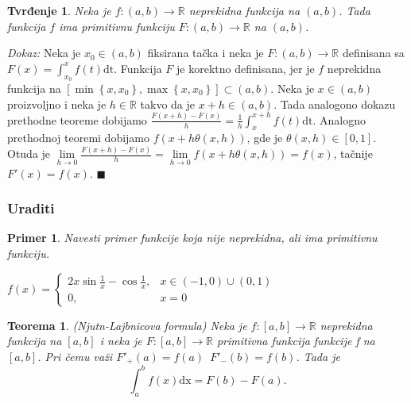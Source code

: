 \documentclass{article}
\newtheorem{teorema}{Teorema}[section]
\newtheorem{tvr}{Tvrđenje}[section]
\newtheorem{prim}{Primer}[section]
\begin{document}
\begin{tvrbox}
    \label{tvrđenje_2.1}
    \begin{tvr}
        Neka je $f: \left(a, b\right) \longrightarrow \mathbb{R}$ neprekidna funkcija na $\left(a,b\right)$. Tada funkcija $f$ ima primitivnu funkciju $F: \left(a,b\right)\longrightarrow\mathbb{R}$ na $\left(a, b\right)$.
    \end{tvr}
\end{tvrbox}
\textit{Dokaz:} Neka je $x_0\in\left(a, b\right)$ fiksirana tačka i neka je $F:\left(a, b\right) \longrightarrow \mathbb{R}$ definisana sa $F\left(x\right) = \displaystyle\int^x_{x_0} f\left(t\right)\text{dt}$.
Funkcija $F$ je korektno definisana, jer je $f$ neprekidna funkcija na $\left[\min\left\{x, x_0\right\}, \max\left\{x, x_0\right\}\right]\subset\left(a, b\right)$. Neka
je $x\in\left(a, b\right)$ proizvoljno i neka je $h\in\mathbb{R}$ takvo da je $x+h\in\left(a, b\right)$. Tada analogono dokazu prethodne teoreme dobijamo
$\displaystyle\frac{F\left(x+h\right)-F\left(x\right)}{h} = \frac{1}{h}\int^{x+h}_x f\left(t\right)\text{dt}$.
Analogno prethodnoj teoremi dobijamo $f\left(x+h\theta\left(x, h\right)\right)$, gde je $\theta\left(x, h\right)\in\left[0,1\right]$.
Otuda je $\displaystyle \lim\limits_{h\longrightarrow 0}\frac{F\left(x+h\right)-F\left(x\right)}{h} = \lim\limits_{h\longrightarrow 0} f\left(x+h\theta\left(x, h\right)\right) = f\left(x\right)$, tačnije
$F'\left(x\right) = f\left(x\right)$.
\null\hfill $\blacksquare$\par

\subsubsection{Uraditi}
\begin{primbox}
    \label{primer_2.4}
    \begin{prim}
        Navesti primer funkcije koja nije neprekidna, ali ima primitivnu funkciju.
    \end{prim}
    $f\left(x\right) = \begin{cases}
            2x\sin\frac{1}{x} - \cos\frac{1}{x}, & x\in\left(-1,0\right)\cup\left(0,1\right) \\
            0,                                   & x = 0
        \end{cases}$
\end{primbox}

\begin{teoremabox}
    \label{teorema_2.9}
    \begin{teorema}
        (Njutn-Lajbnicova formula) Neka je $f:\left[a, b\right]\longrightarrow \mathbb{R}$ neprekidna funkcija na $\left[a,b\right]$ i neka je $F:\left[a, b\right]\longrightarrow\mathbb{R}$ primitivna funkcija funkcije f na $\left[a,b\right]$. Pri čemu važi $F'_+ \left(a\right) = f\left(a\right)\,\,\,F'_-\left(b\right) = f\left(b\right)$. Tada je
        $$ \int^b_a f\left(x\right)\text{dx} = F\left(b\right) - F\left(a\right).$$
    \end{teorema}
\end{teoremabox}
\end{document}
